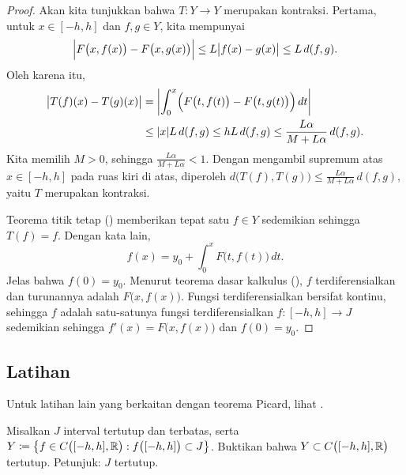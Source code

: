 \begin{proof}
Akan kita tunjukkan bahwa $T \colon Y \to Y$ merupakan kontraksi. Pertama, untuk $x \in [-h,h]$
dan $f,g \in Y$, kita mempunyai
\begin{equation*}
\Bigl\lvert {F\bigl(x,f(x)\bigr) - F\bigl(x,g(x)\bigr)} \Bigr\rvert \leq
L\bigl\lvert {f(x)- g(x)} \bigr\rvert \leq L \, d(f,g) .
\end{equation*}
Oleh karena itu,
\begin{equation*}
\begin{split}
\bigl\lvert {T(f)(x) - T(g)(x)} \bigr\rvert
&= \left\lvert {\int_0^x \Bigl( F\bigl(t,f(t)\bigr) - F\bigl(t,g(t)\bigr)\Bigr)\,dt} \right\rvert \\
& \leq \lvert {x} \rvert L \, d(f,g)
 \leq h L\, d(f,g)
 \leq \frac{L\alpha}{M+L\alpha} \, d(f,g) .
\end{split}
\end{equation*}
Kita memilih $M > 0$, sehingga
$\frac{L\alpha}{M+L\alpha} < 1$.
Dengan mengambil supremum atas $x \in [-h,h]$ pada ruas kiri di atas, diperoleh
$d\bigl(T(f),T(g)\bigr) \leq \frac{L\alpha}{M+L\alpha} \, d(f,g)$,
yaitu $T$ merupakan kontraksi.

Teorema titik tetap ()
memberikan tepat satu $f \in Y$ sedemikian sehingga $T(f) = f$.
Dengan kata lain,
\begin{equation*} %
f(x) = y_0 + \int_0^x F\bigl(t,f(t)\bigr)\,dt .
\end{equation*}
Jelas bahwa $f(0) = y_0$.
Menurut teorema dasar kalkulus (),
$f$ terdiferensialkan dan turunannya adalah
$F\bigl(x,f(x)\bigr)$.
Fungsi terdiferensialkan bersifat kontinu, sehingga
$f$ adalah satu-satunya fungsi terdiferensialkan $f \colon [-h,h] \to J$
sedemikian sehingga
 $f'(x) = F\bigl(x,f(x)\bigr)$ dan $f(0) = y_0$.
\end{proof}

\subsection{Latihan}

\begin{exnote}
Untuk latihan lain yang berkaitan dengan teorema Picard, lihat .
\end{exnote}

\begin{exercise}
Misalkan $J$ interval tertutup dan terbatas, serta
$Y \coloneqq \bigl\{ f \in C\bigl([-h,h],{\mathbb{R}}\bigr) : f\bigl([-h,h]\bigr) \subset J \bigr\}$.
Buktikan bahwa $Y \subset C\bigl([-h,h],{\mathbb{R}}\bigr)$ tertutup.  Petunjuk: $J$ tertutup.
\end{exercise}

